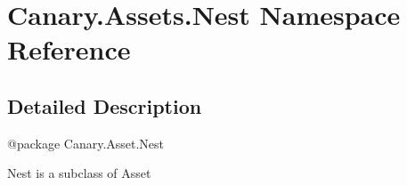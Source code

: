 \hypertarget{namespace_canary_1_1_assets_1_1_nest}{\section{Canary.\-Assets.\-Nest Namespace Reference}
\label{namespace_canary_1_1_assets_1_1_nest}
}


\subsection{Detailed Description}
\begin{DoxyVerb}@package Canary.Asset.Nest

Nest is a subclass of Asset
\end{DoxyVerb}
 